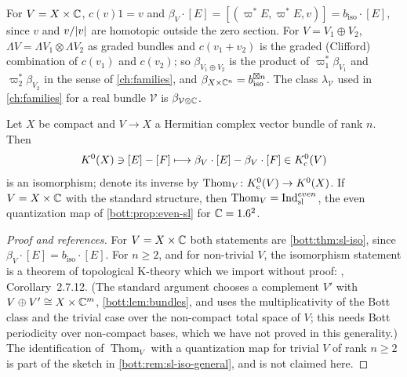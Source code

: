 For $V=X\times\mathbb{C}$, $c(v)1=v$ and $\beta_V\cdot[E]=[(\varpi^*E,\varpi^*E,v)]=b_{\mathrm{iso}}\cdot[E]$,
since $v$ and $v/\lvert v\rvert$ are homotopic outside the zero section. For $V=V_1\oplus V_2$,
$\Lambda V=\Lambda V_1\otimes\Lambda V_2$ as graded bundles and $c(v_1+v_2)$ is the graded
(Clifford) combination of $c(v_1)$ and $c(v_2)$; so $\beta_{V_1\oplus V_2}$ is the product of
$\varpi_1^*\beta_{V_1}$ and $\varpi_2^*\beta_{V_2}$ in the sense of \cref{ch:families}, and
$\beta_{X\times\mathbb{C}^n}=b_{\mathrm{iso}}^{\boxtimes n}$. The class $\lambda_{\mathcal V}$ used in
\cref{ch:families} for a real bundle $\mathcal V$ is $\beta_{\mathcal V\otimes\mathbb{C}}$.

\begin{theorem}\label{bott:thm:thom}
  Let $X$ be compact and $V\to X$ a Hermitian complex vector bundle of rank $n$. Then
  \begin{equation*}
    K^0(X)\ni[E]-[F]\longmapsto\beta_V\cdot[E]-\beta_V\cdot[F]\in K_{\mathrm{c}}^0(V)
  \end{equation*}
  is an isomorphism; denote its inverse by $\operatorname{Thom}_V\colon K_{\mathrm{c}}^0(V)\to K^0(X)$. If
  $V=X\times\mathbb{C}$ with the standard structure, then
  $\operatorname{Thom}_V=\operatorname{Ind}^{even}_{\mathrm{sl}}$, the even quantization map of
  \cref{bott:prop:even-sl} for $\mathbb{C}=1.6^{2}$.
\end{theorem}
\begin{proof}[Proof and references]
  For $V=X\times\mathbb{C}$ both statements are \cref{bott:thm:sl-iso}, since
  $\beta_V\cdot[E]=b_{\mathrm{iso}}\cdot[E]$. For $n\ge2$, and for non-trivial $V$, the
  isomorphism statement is a theorem of topological K-theory which we import without proof:
  \cite{Atiyah-K}, Corollary~2.7.12. (The standard argument chooses a complement $V'$ with
  $V\oplus V'\cong X\times\mathbb{C}^m$, \cref{bott:lem:bundles}, and uses the multiplicativity of the
  Bott class and the trivial case over the non-compact total space of $V$; this needs Bott
  periodicity over non-compact bases, which we have not proved in this generality.) The
  identification of $\operatorname{Thom}_V$ with a quantization map for trivial $V$ of
  rank $n\ge2$ is part of the sketch in \cref{bott:rem:sl-iso-general}, and is not claimed
  here.
\end{proof}

